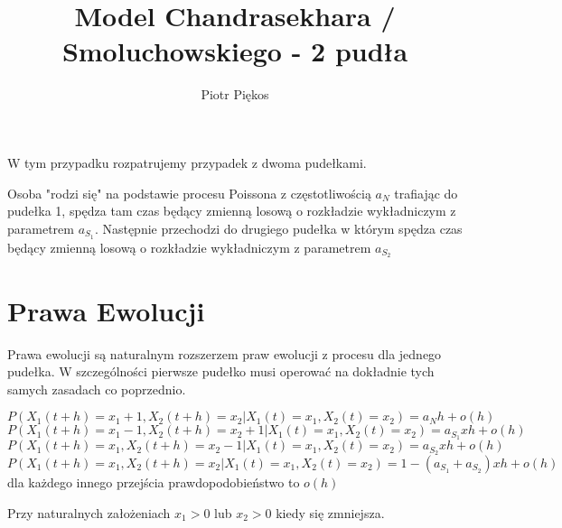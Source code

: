 \documentclass{article}
\begin{document}
\title{Model Chandrasekhara / Smoluchowskiego  - 2 pudła}
\author{Piotr Piękos}

\maketitle

W tym przypadku rozpatrujemy przypadek z dwoma pudełkami. 

Osoba "rodzi się" na podstawie procesu Poissona z częstotliwością $a_N$ trafiając do pudełka 1, spędza tam czas będący zmienną losową o rozkładzie wykładniczym z parametrem $a_{S_1}$. Następnie przechodzi do drugiego pudełka w którym spędza czas będący zmienną losową o rozkładzie wykładniczym z parametrem $a_{S_2}$
\section{Prawa Ewolucji}

Prawa ewolucji są naturalnym rozszerzem praw ewolucji z procesu dla jednego pudełka. W szczególności pierwsze pudełko musi operować na dokładnie tych samych zasadach co poprzednio.

\[P(X_1(t+h) = x_1 + 1, X_2(t+h)=x_2 | X_1(t) = x_1, X_2(t) = x_2) = a_N h + o(h)\]
\[P(X_1(t+h) = x_1 - 1, X_2(t+h)=x_2 + 1| X_1(t) = x_1, X_2(t) = x_2) = a_{S_1} xh + o(h)\]
\[P(X_1(t+h) = x_1, X_2(t+h)=x_2 - 1| X_1(t) = x_1, X_2(t) = x_2) = a_{S_2} xh + o(h)\]
\[P(X_1(t+h) = x_1, X_2(t+h)=x_2| X_1(t) = x_1, X_2(t) = x_2) = 1 - (a_{S_1}  + a_{S_2})xh + o(h)\]
dla każdego innego przejścia prawdopodobieństwo to $o(h)$

Przy naturalnych założeniach $x_1 > 0$ lub $x_2 > 0$ kiedy się zmniejsza.
\end{document}
